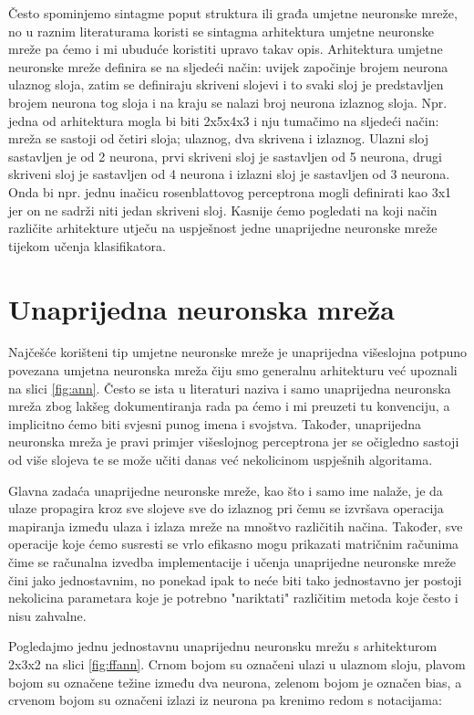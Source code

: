 \documentclass[times, utf8, zavrsni]{fer}
\begin{document}
Često spominjemo sintagme poput struktura ili građa umjetne neuronske mreže, no u raznim literaturama koristi se sintagma arhitektura umjetne neuronske mreže pa ćemo i mi ubuduće koristiti upravo takav opis. Arhitektura umjetne neuronske mreže definira se na sljedeći način: uvijek započinje brojem neurona ulaznog sloja, zatim se definiraju skriveni slojevi i to svaki sloj je predstavljen brojem neurona tog sloja i na kraju se nalazi broj neurona izlaznog sloja. Npr. jedna od arhitektura mogla bi biti 2x5x4x3 i nju tumačimo na sljedeći način: mreža se sastoji od četiri sloja; ulaznog, dva skrivena i izlaznog. Ulazni sloj sastavljen je od 2 neurona, prvi skriveni sloj je sastavljen od 5 neurona, drugi skriveni sloj je sastavljen od 4 neurona i izlazni sloj je sastavljen od 3 neurona. Onda bi npr. jednu inačicu rosenblattovog perceptrona mogli definirati kao 3x1 jer on ne sadrži niti jedan skriveni sloj. Kasnije ćemo pogledati na koji način različite arhitekture utječu na uspješnost jedne unaprijedne neuronske mreže tijekom učenja klasifikatora.

\section{Unaprijedna neuronska mreža}
Najčešće korišteni tip umjetne neuronske mreže je unaprijedna višeslojna potpuno povezana umjetna neuronska mreža  čiju smo generalnu arhitekturu već upoznali na slici \ref{fig:ann}. Često se ista u literaturi naziva i samo unaprijedna neuronska mreža zbog lakšeg dokumentiranja rada pa ćemo i mi preuzeti tu konvenciju, a implicitno ćemo biti svjesni punog imena i svojstva. Također, unaprijedna neuronska mreža je pravi primjer višeslojnog perceptrona jer se očigledno sastoji od više slojeva te se može učiti danas već nekolicinom uspješnih algoritama.

Glavna zadaća unaprijedne neuronske mreže, kao što i samo ime nalaže, je da ulaze propagira kroz sve slojeve sve do izlaznog pri čemu se izvršava operacija mapiranja između ulaza i izlaza mreže na mnoštvo različitih načina. Također, sve operacije koje ćemo susresti se vrlo efikasno mogu prikazati matričnim računima čime se računalna izvedba implementacije i učenja unaprijedne neuronske mreže čini jako jednostavnim, no ponekad ipak to neće biti tako jednostavno jer postoji nekolicina parametara koje je potrebno "nariktati" različitim metoda koje često i nisu zahvalne.

Pogledajmo jednu jednostavnu unaprijednu neuronsku mrežu s arhitekturom 2x3x2 na slici \ref{fig:ffann}.
Crnom bojom su označeni ulazi u ulaznom sloju, plavom bojom su označene težine između dva neurona, zelenom bojom je označen bias, a crvenom bojom su označeni izlazi iz neurona pa krenimo redom s notacijama:
\end{document}
